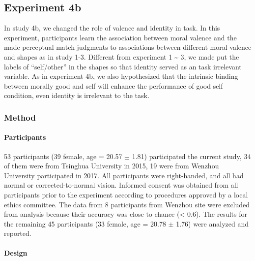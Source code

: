 \documentclass[
  english,
  man]{apa6}
\let\oldparagraph\paragraph
\renewcommand{\paragraph}[1]{\oldparagraph{#1}\mbox{}}
\begin{document}
\hypertarget{experiment-4b}{%
\subsection{Experiment 4b}\label{experiment-4b}}

In study 4b, we changed the role of valence and identity in task. In this experiment, participants learn the association between moral valence and the made perceptual match judgments to associations between different moral valence and shapes as in study 1-3. Different from experiment 1 \textasciitilde{} 3, we made put the labels of \enquote{self/other} in the shapes so that identity served as an task irrelevant variable. As in experiment 4b, we also hypothesized that the intrinsic binding between morally good and self will enhance the performance of good self condition, even identity is irrelevant to the task.

\hypertarget{method-7}{%
\subsubsection{Method}\label{method-7}}

\hypertarget{participants-9}{%
\paragraph{Participants}\label{participants-9}}

53 participants (39 female, age = 20.57 \(\pm\) 1.81) participated the current study, 34 of them were from Tsinghua University in 2015, 19 were from Wenzhou University participated in 2017. All participants were right-handed, and all had normal or corrected-to-normal vision. Informed consent was obtained from all participants prior to the experiment according to procedures approved by a local ethics committee. The data from 8 participants from Wenzhou site were excluded from analysis because their accuracy was close to chance (\textless{} 0.6). The results for the remaining 45 participants (33 female, age = 20.78 \(\pm\) 1.76) were analyzed and reported.

\hypertarget{design-4}{%
\paragraph{Design}\label{design-4}}
\end{document}
